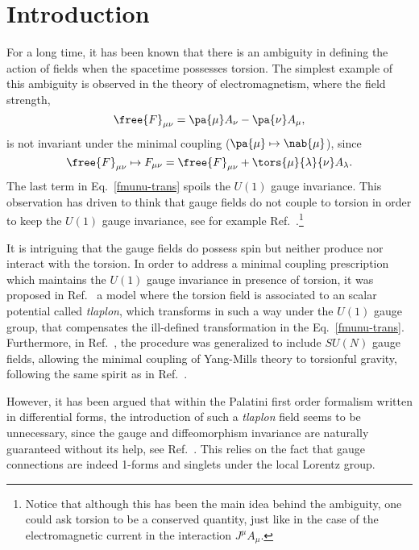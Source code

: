 \section{Introduction\label{sec:intro}}

For a long time, it has been known that there is an ambiguity in
defining the action of fields when the spacetime possesses torsion.
The simplest example of this ambiguity is observed in the theory
of electromagnetism, where the field strength, 
\begin{equation*}
  \free{F}_{\mu\nu} = \pa{\mu} A_\nu - \pa{\nu} A_\mu,
\end{equation*}
is not invariant under the minimal coupling \mbox{($\pa{\mu} \mapsto \nab{\mu}$),} since
\begin{equation}
  \free{F}_{\mu\nu} \mapsto {F}_{\mu\nu} = \free{F}_{\mu\nu} + \tors{\mu}{\lambda}{\nu} A_\lambda.
  \label{fmunu-trans}
\end{equation}
The last term in Eq.~\eqref{fmunu-trans} spoils the $U (1)$ gauge
invariance. This observation has driven to think that
gauge fields do not couple to torsion in order to keep the
$U (1)$ gauge invariance, see for example
Ref.~\cite{Hehl:1976kj}.\footnote{Notice that although this has
  been the main idea behind the ambiguity, one could ask torsion
  to be a conserved quantity, just like in the case of the
  electromagnetic current in the interaction $J^\mu A_\mu$.}

It is intriguing that the gauge fields do possess spin but
neither produce nor interact with the torsion. In order to
address a minimal coupling prescription which maintains the
$U (1)$ gauge invariance in presence of torsion, it was
proposed in Ref.~\cite{PhysRevD.17.3141} a model
where the torsion field is associated to an scalar potential
called \emph{tlaplon}, which transforms in such a way under
the $U (1)$ gauge group, that compensates the ill-defined
transformation in the Eq.~\eqref{fmunu-trans}. Furthermore,
in Ref.~\cite{Mukku:1978mz},
the procedure was generalized to include $SU (N )$ gauge
fields, allowing the minimal coupling of Yang-Mills theory
to torsionful gravity, following the same spirit as in
Ref.~\cite{PhysRevD.17.3141}.

However, it has been argued that within the Palatini
first order formalism written in differential forms, the
introduction of such a \emph{tlaplon} field seems to be
unnecessary, since the gauge and diffeomorphism invariance are
naturally guaranteed without its help, see Ref.~\cite{Benn:1980ea}.
This relies on the fact that gauge connections are indeed
1-forms and singlets under the local Lorentz group.

